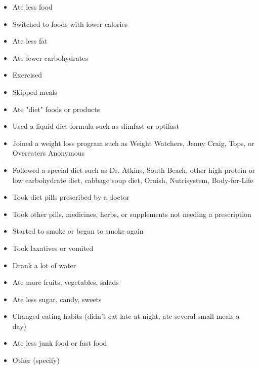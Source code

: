 \documentclass{article}
\begin{document}
\begin{itemize}
\item Ate less food
\item Switched to foods with lower calories
\item Ate less fat
\item Ate fewer carbohydrates
\item Exercised
\item Skipped meals
\item Ate "diet" foods or products
\item Used a liquid diet formula such as slimfast or optifast
\item Joined a weight loss program such as Weight Watchers, Jenny Craig, Tops, or Overeaters Anonymous
\item Followed a special diet such as Dr. Atkins, South Beach, other high protein or low carbohydrate diet, cabbage soup diet, Ornish, Nutrisystem, Body-for-Life
\item Took diet pills prescribed by a doctor
\item Took other pills, medicines, herbs, or supplements not needing a prescription
\item Started to smoke or began to smoke again
\item Took laxatives or vomited
\item Drank a lot of water
\item Ate more fruits, vegetables, salads
\item Ate less sugar, candy, sweets
\item Changed eating habits (didn't eat late at night, ate several small meals a day)
\item Ate less junk food or fast food
\item Other (specify)
\end{itemize}
\end{document}
